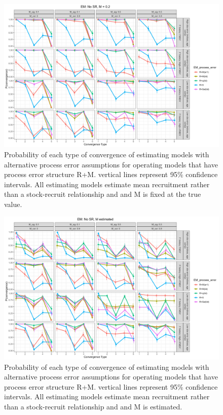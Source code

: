 \documentclass[
  12pt,
]{article}
\begin{document}
\begin{landscape}
\begin{figure}
\caption{Probability of each type of convergence of estimating models with alternative process error assumptions for operating models that have process error structure R+M. vertical lines represent 95\% confidence intervals. All estimating models estimate mean recruitment rather than a stock-recruit relationship and and M is fixed at the true value.}\label{M_om_em_R_MF_convergence}
\begin{center}
\includegraphics[width = \textwidth]{M_om_p_convergence_meanR_M_fixed.png}
\end{center}
\end{figure}
\end{landscape}

\begin{landscape}
\begin{figure}
\caption{Probability of each type of convergence of estimating models with alternative process error assumptions for operating models that have process error structure R+M. vertical lines represent 95\% confidence intervals. All estimating models estimate mean recruitment rather than a stock-recruit relationship and and M is estimated.}\label{M_om_em_R_ME_convergence}
\begin{center}
\includegraphics[width = \textwidth]{M_om_p_convergence_meanR_M_estimated.png}
\end{center}
\end{figure}
\end{landscape}
\end{document}
